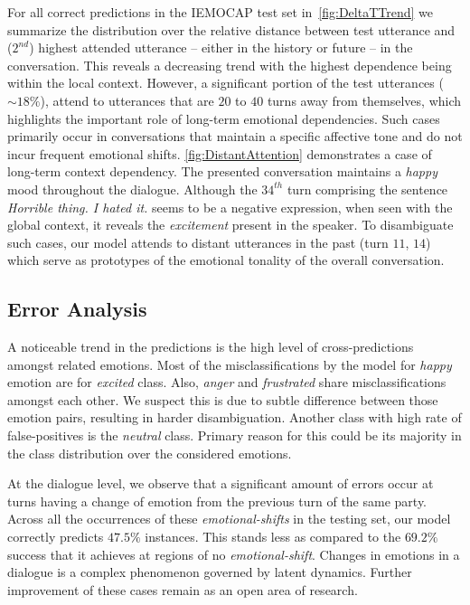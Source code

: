 \documentclass[letterpaper]{article} %
\begin{document}
For all correct predictions in the IEMOCAP test set in~\cref{fig:DeltaTTrend} we summarize the distribution over the relative distance between test utterance and ($2^{nd}$) highest attended utterance -- either in the history or future -- in the conversation. This reveals a decreasing trend with the highest dependence being within the local context. However, a significant portion of the test utterances ($\sim18\%$), attend to utterances that are $20$ to $40$ turns away from themselves, which  highlights the important role of long-term emotional dependencies. Such cases primarily occur in conversations that maintain a specific affective tone and do not incur frequent emotional shifts.
\cref{fig:DistantAttention} demonstrates a case of long-term context dependency. The presented conversation maintains a \emph{happy} mood throughout the dialogue. Although the $34^{th}$ turn comprising the
sentence \emph{Horrible thing. I hated it.}
seems to be a negative expression, when seen with the global
context, it reveals the \emph{excitement} present in the speaker. To disambiguate such cases, our model attends
to distant utterances in the past (turn $11$, $14$) which serve as prototypes of the emotional tonality of the
overall conversation. 

\subsection{Error Analysis}
\label{sec:error-analysis}
A noticeable trend in the predictions
is the high level of cross-predictions amongst related emotions. Most of the misclassifications by the model for \emph{happy} emotion are for \emph{excited} class. Also, \emph{anger} and \emph{frustrated} share misclassifications amongst each other. We suspect this is due to subtle difference between those emotion pairs, resulting in harder disambiguation.
Another class with high rate of false-positives is the \emph{neutral} class. Primary reason for this could be its majority in the class distribution over the considered emotions.

At the dialogue level, we observe that a significant amount of errors occur at turns having a change of
emotion from the previous turn of the same party. Across all the
occurrences of these \emph{emotional-shifts} in the testing set, our model correctly predicts $47.5\%$ instances. This stands less as compared to the $69.2\%$ success that it achieves at regions of no
\emph{emotional-shift}. Changes in emotions in a dialogue is a complex phenomenon governed by latent dynamics. Further improvement of these cases remain as an open area of research.
\end{document}
